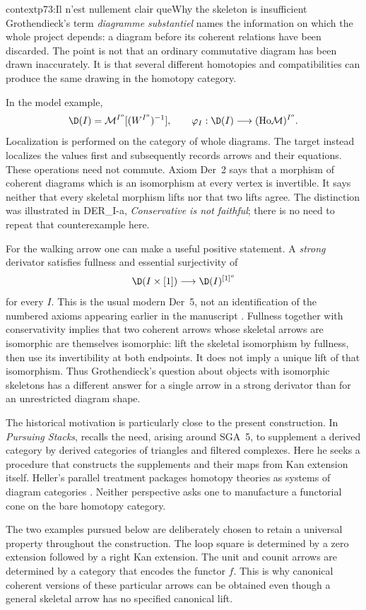 \begin{dcomment}{context}{p73:Il n'est nullement clair que}{Why the skeleton is insufficient}
Grothendieck's term \emph{diagramme substantiel} names the information on which the whole project depends: a diagram before its coherent relations have been discarded. The point is not that an ordinary commutative diagram has been drawn inaccurately. It is that several different homotopies and compatibilities can produce the same drawing in the homotopy category.

In the model example,
\[
 \D(I)=\mathcal M^{I^o}[(W^{I^o})^{-1}],
 \qquad
 \varphi_I:\D(I)\longrightarrow(\mathrm{Ho}\mathcal M)^{I^o}.
\]
Localization is performed on the category of whole diagrams. The target instead localizes the values first and subsequently records arrows and their equations. These operations need not commute. Axiom Der~2 says that a morphism of coherent diagrams which is an isomorphism at every vertex is invertible. It says neither that every skeletal morphism lifts nor that two lifts agree. The distinction was illustrated in DER\_I-a, \emph{Conservative is not faithful}; there is no need to repeat that counterexample here.

For the walking arrow one can make a useful positive statement. A \emph{strong} derivator satisfies fullness and essential surjectivity of
\[
 \D(I\times[1])\longrightarrow\D(I)^{[1]^o}
\]
for every \(I\). This is the usual modern Der~5, not an identification of the numbered axioms appearing earlier in the manuscript \citep[Definition 1.8]{Groth2013}. Fullness together with conservativity implies that two coherent arrows whose skeletal arrows are isomorphic are themselves isomorphic: lift the skeletal isomorphism by fullness, then use its invertibility at both endpoints. It does not imply a unique lift of that isomorphism. Thus Grothendieck's question about objects with isomorphic skeletons has a different answer for a single arrow in a strong derivator than for an unrestricted diagram shape.

The historical motivation is particularly close to the present construction. In \emph{Pursuing Stacks}, \citet[Section 69, pp.~1--2 of the edited extract]{Grothendieck1983} recalls the need, arising around SGA~5, to supplement a derived category by derived categories of triangles and filtered complexes. Here he seeks a procedure that constructs the supplements and their maps from Kan extension itself. Heller's parallel treatment packages homotopy theories as systems of diagram categories \citep[Introduction and Chapter I]{Heller1988}. Neither perspective asks one to manufacture a functorial cone on the bare homotopy category.

The two examples pursued below are deliberately chosen to retain a universal property throughout the construction. The loop square is determined by a zero extension followed by a right Kan extension. The unit and counit arrows are determined by a category that encodes the functor \(f\). This is why canonical coherent versions of these particular arrows can be obtained even though a general skeletal arrow has no specified canonical lift.
\end{dcomment}

